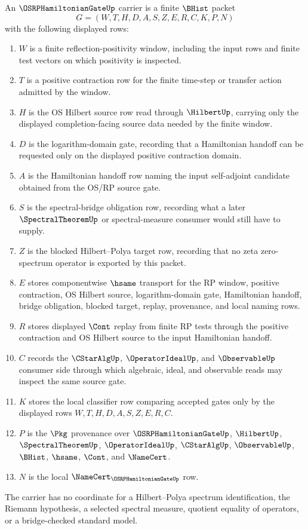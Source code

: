 \begin{definition}
\label{def:os-rp-hamiltonian-gate-carrier}
An $\OSRPHamiltonianGateUp$ carrier is a finite $\BHist$ packet
$$
G=(W,T,H,D,A,S,Z,E,R,C,K,P,N)
$$
with the following displayed rows:
\begin{enumerate}
\item $W$ is a finite reflection-positivity window, including the input rows and finite test vectors on which positivity is inspected.
\item $T$ is a positive contraction row for the finite time-step or transfer action admitted by the window.
\item $H$ is the OS Hilbert source row read through $\HilbertUp$, carrying only the displayed completion-facing source data needed by the finite window.
\item $D$ is the logarithm-domain gate, recording that a Hamiltonian handoff can be requested only on the displayed positive contraction domain.
\item $A$ is the Hamiltonian handoff row naming the input self-adjoint candidate obtained from the OS/RP source gate.
\item $S$ is the spectral-bridge obligation row, recording what a later $\SpectralTheoremUp$ or spectral-measure consumer would still have to supply.
\item $Z$ is the blocked Hilbert--Polya target row, recording that no zeta zero-spectrum operator is exported by this packet.
\item $E$ stores componentwise $\hsame$ transport for the RP window, positive contraction, OS Hilbert source, logarithm-domain gate, Hamiltonian handoff, bridge obligation, blocked target, replay, provenance, and local naming rows.
\item $R$ stores displayed $\Cont$ replay from finite RP tests through the positive contraction and OS Hilbert source to the input Hamiltonian handoff.
\item $C$ records the $\CStarAlgUp$, $\OperatorIdealUp$, and $\ObservableUp$ consumer side through which algebraic, ideal, and observable reads may inspect the same source gate.
\item $K$ stores the local classifier row comparing accepted gates only by the displayed rows $W,T,H,D,A,S,Z,E,R,C$.
\item $P$ is the $\Pkg$ provenance over $\OSRPHamiltonianGateUp$, $\HilbertUp$, $\SpectralTheoremUp$, $\OperatorIdealUp$, $\CStarAlgUp$, $\ObservableUp$, $\BHist$, $\hsame$, $\Cont$, and $\NameCert$.
\item $N$ is the local $\NameCert_{\OSRPHamiltonianGateUp}$ row.
\end{enumerate}
The carrier has no coordinate for a Hilbert--Polya spectrum identification, the Riemann hypothesis, a selected spectral measure, quotient equality of operators, or a bridge-checked standard model.
\end{definition}

